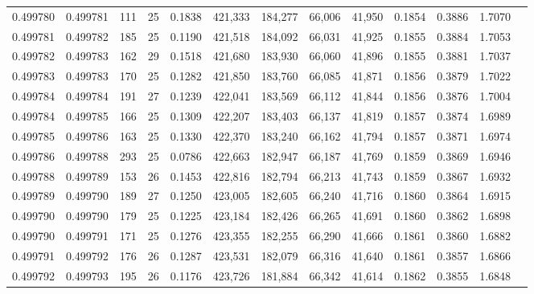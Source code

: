 \begin{tabular}{rrrrrrrrrrrrr}
0.499780 & 0.499781 & 111 &  25 &                                     0.1838 & 421,333 & 184,277 &  66,006 &  41,950 & 0.1854 & 0.3886 & 1.7070 \\
0.499781 & 0.499782 & 185 &  25 &                                     0.1190 & 421,518 & 184,092 &  66,031 &  41,925 & 0.1855 & 0.3884 & 1.7053 \\
0.499782 & 0.499783 & 162 &  29 &                                     0.1518 & 421,680 & 183,930 &  66,060 &  41,896 & 0.1855 & 0.3881 & 1.7037 \\
0.499783 & 0.499783 & 170 &  25 &                                     0.1282 & 421,850 & 183,760 &  66,085 &  41,871 & 0.1856 & 0.3879 & 1.7022 \\
0.499784 & 0.499784 & 191 &  27 &                                     0.1239 & 422,041 & 183,569 &  66,112 &  41,844 & 0.1856 & 0.3876 & 1.7004 \\
0.499784 & 0.499785 & 166 &  25 &                                     0.1309 & 422,207 & 183,403 &  66,137 &  41,819 & 0.1857 & 0.3874 & 1.6989 \\
0.499785 & 0.499786 & 163 &  25 &                                     0.1330 & 422,370 & 183,240 &  66,162 &  41,794 & 0.1857 & 0.3871 & 1.6974 \\
0.499786 & 0.499788 & 293 &  25 &                                     0.0786 & 422,663 & 182,947 &  66,187 &  41,769 & 0.1859 & 0.3869 & 1.6946 \\
0.499788 & 0.499789 & 153 &  26 &                                     0.1453 & 422,816 & 182,794 &  66,213 &  41,743 & 0.1859 & 0.3867 & 1.6932 \\
0.499789 & 0.499790 & 189 &  27 &                                     0.1250 & 423,005 & 182,605 &  66,240 &  41,716 & 0.1860 & 0.3864 & 1.6915 \\
0.499790 & 0.499790 & 179 &  25 &                                     0.1225 & 423,184 & 182,426 &  66,265 &  41,691 & 0.1860 & 0.3862 & 1.6898 \\
0.499790 & 0.499791 & 171 &  25 &                                     0.1276 & 423,355 & 182,255 &  66,290 &  41,666 & 0.1861 & 0.3860 & 1.6882 \\
0.499791 & 0.499792 & 176 &  26 &                                     0.1287 & 423,531 & 182,079 &  66,316 &  41,640 & 0.1861 & 0.3857 & 1.6866 \\
0.499792 & 0.499793 & 195 &  26 &                                     0.1176 & 423,726 & 181,884 &  66,342 &  41,614 & 0.1862 & 0.3855 & 1.6848 \\

\end{tabular}
